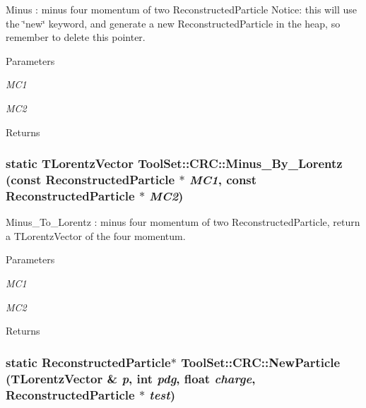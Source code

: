 Minus : minus four momentum of two ReconstructedParticle Notice: this will use the \char`\"{}new\char`\"{} keyword, and generate a new ReconstructedParticle in the heap, so remember to delete this pointer. 
\begin{DoxyParams}{Parameters}
\item[{\em MC1}]\item[{\em MC2}]\end{DoxyParams}
\begin{DoxyReturn}{Returns}

\end{DoxyReturn}
\hypertarget{classToolSet_1_1CRC_a152788d7b317ba47c0f003fd3c574caa}{
\subsubsection[{Minus\_\-By\_\-Lorentz}]{\setlength{\rightskip}{0pt plus 5cm}static TLorentzVector ToolSet::CRC::Minus\_\-By\_\-Lorentz (const ReconstructedParticle $\ast$ {\em MC1}, \/  const ReconstructedParticle $\ast$ {\em MC2})}}
\label{classToolSet_1_1CRC_a152788d7b317ba47c0f003fd3c574caa}


Minus\_\-To\_\-Lorentz : minus four momentum of two ReconstructedParticle, return a TLorentzVector of the four momentum. 
\begin{DoxyParams}{Parameters}
\item[{\em MC1}]\item[{\em MC2}]\end{DoxyParams}
\begin{DoxyReturn}{Returns}

\end{DoxyReturn}
\hypertarget{classToolSet_1_1CRC_adff0245c860e4ad9dc82c7bd95253455}{
\subsubsection[{NewParticle}]{\setlength{\rightskip}{0pt plus 5cm}static ReconstructedParticle$\ast$ ToolSet::CRC::NewParticle (TLorentzVector \& {\em p}, \/  int {\em pdg}, \/  float {\em charge}, \/  ReconstructedParticle $\ast$ {\em test})}}
\label{classToolSet_1_1CRC_adff0245c860e4ad9dc82c7bd95253455}


